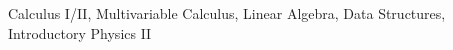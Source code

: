 \documentclass[./Resume.tex]{subfiles}
\begin{document}
		   \begin{center}
			   Calculus I/II, Multivariable Calculus, Linear Algebra, Data Structures, Introductory Physics II
		   \end{center}
\end{document}
